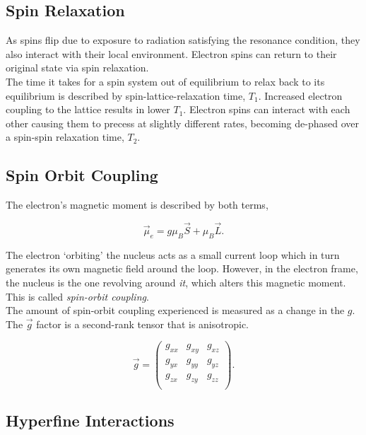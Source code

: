 \documentclass[svgnames]{article}
\begin{document}
\subsection{Spin Relaxation}

As spins flip due to exposure to radiation satisfying the resonance condition,
they also interact with their local environment. Electron spins can return to
their original state via spin relaxation. \\

The time it takes for a spin system out of equilibrium to relax back to its
equilibrium is described by spin-lattice-relaxation time, $T_1$. Increased
electron coupling to the lattice results in lower $T_1$. Electron spins can
interact with each other causing them to precess at slightly
different rates, becoming de-phased over a spin-spin relaxation time, $T_2$. 


\subsection{Spin Orbit Coupling} 

The electron's magnetic moment is described by both terms, 

\[
    \vec{\mu}_e = g\mu_B \vec{S} + \mu_B \vec{L}.
\] \vspace{3px}


The electron `orbiting' the nucleus acts as a small current loop which in turn
generates its own magnetic field around the loop. However, in the electron
frame, the nucleus is the one revolving around \textit{it}, which alters this
magnetic moment. This is called \textit{spin-orbit coupling}. \\ 

The amount of spin-orbit coupling experienced is measured as a change in the
$g$. The $\vec{g}$ factor is a second-rank tensor that is anisotropic. 

\[
    \vec{g} = \begin{pmatrix}
        g_{xx} & g_{xy} & g_{xz} \\ 
        g_{yx} & g_{yy} & g_{yz} \\ 
        g_{zx} & g_{zy} & g_{zz} \\ 
    \end{pmatrix}.
\] \vspace{3px}

\subsection{Hyperfine Interactions}
\end{document}
